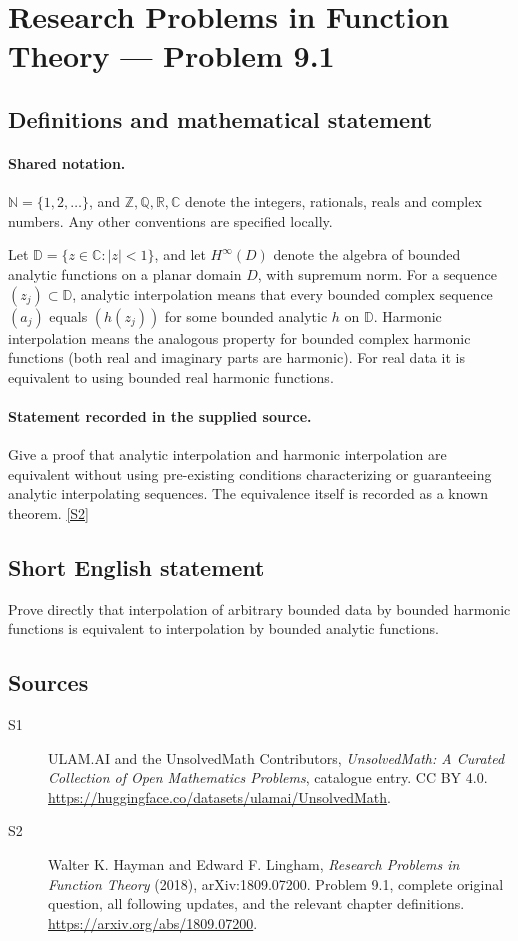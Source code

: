 \documentclass[11pt]{book}
\newcommand{\sref}[2]{\hyperlink{source:#1:#2}{[S#2]}}
\begin{document}
\section{Research Problems in Function Theory — Problem 9.1}\label{statement}

\subsection{Definitions and mathematical statement}

\paragraph{Shared notation.}$\mathbb N=\{1,2,\ldots\}$, and $\mathbb Z,\mathbb Q,\mathbb R,\mathbb C$ denote the integers, rationals, reals and complex numbers. Any other conventions are specified locally.


Let $\mathbb D=\{z\in\mathbb C:|z|<1\}$, and let $H^{\infty}(D)$ denote the algebra of bounded analytic functions on a planar domain $D$, with supremum norm. For a sequence $(z_j)\subset\mathbb D$, analytic interpolation means that every bounded complex sequence $(a_j)$ equals $(h(z_j))$ for some bounded analytic $h$ on $\mathbb D$. Harmonic interpolation means the analogous property for bounded complex harmonic functions (both real and imaginary parts are harmonic). For real data it is equivalent to using bounded real harmonic functions.
\paragraph{Statement recorded in the supplied source.}
Give a proof that analytic interpolation and harmonic interpolation are equivalent without using pre-existing conditions characterizing or guaranteeing analytic interpolating sequences. The equivalence itself is recorded as a known theorem. \sref{statement}{2}
\subsection{Short English statement}
Prove directly that interpolation of arbitrary bounded data by bounded harmonic functions is equivalent to interpolation by bounded analytic functions.
\subsection{Sources}
\begin{description}
\item[\hypertarget{source:statement:1}{S1}] ULAM.AI and the UnsolvedMath Contributors, \emph{UnsolvedMath: A Curated Collection of Open Mathematics Problems}, catalogue entry. CC BY 4.0. \url{https://huggingface.co/datasets/ulamai/UnsolvedMath}.
\item[\hypertarget{source:statement:2}{S2}] Walter K. Hayman and Edward F. Lingham, \emph{Research Problems in Function Theory} (2018), arXiv:1809.07200. Problem 9.1, complete original question, all following updates, and the relevant chapter definitions. \url{https://arxiv.org/abs/1809.07200}.
\end{description}
\label{end:statement}
\end{document}
